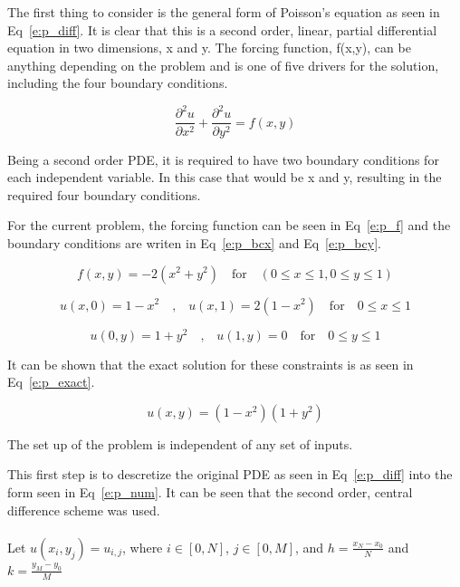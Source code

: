 \documentclass[]{aiaa-tc}%
\begin{document}
The first thing to consider is the general form of Poisson's equation as seen in
Eq~\ref{e:p_diff}. It is clear that this is a second order, linear, partial differential
equation in two dimensions, x and y. The forcing function, f(x,y), can be anything
depending on the problem and is one of five drivers for the solution, including the
four boundary conditions.

\begin{equation}
  \label{e:p_diff}
  \frac{\partial ^2 u}{\partial x^2} + \frac{\partial ^2 u}{\partial y^2} = f(x,y)
\end{equation}

Being a second order PDE, it is required to have two boundary conditions for each
independent variable. In this case that would be x and y, resulting in the required
four boundary conditions.

For the current problem, the forcing function can be seen in Eq~\ref{e:p_f}
and the boundary conditions are writen in Eq~\ref{e:p_bcx} and Eq~\ref{e:p_bcy}.

\begin{equation}
  \label{e:p_f}
  f(x,y) = -2(x^2 + y^2)\quad \textrm{for} \quad (0 \leq x \leq 1, 0 \leq y \leq 1)
\end{equation}

\begin{equation}
  \label{e:p_bcx}
  u(x,0) = 1 - x^2 \quad \textrm{,} \quad u(x,1) = 2(1 - x^2) \quad \textrm{for} \quad 0 \leq x \leq 1
\end{equation}

\begin{equation}
  \label{e:p_bcy}
  u(0,y) = 1 + y^2 \quad \textrm{,} \quad u(1,y) = 0 \quad \textrm{for} \quad 0 \leq y \leq 1
\end{equation}

It can be shown that the exact solution for these constraints is as seen in Eq~\ref{e:p_exact}.

\begin{equation}
  \label{e:p_exact}
  u(x,y) = (1 - x^2)(1 + y^2)
\end{equation}

The set up of the problem is independent of any set of inputs.

This first step is to descretize the original PDE as seen in Eq~\ref{e:p_diff} into
the form seen in Eq~\ref{e:p_num}. It can be seen that the second order, central
difference scheme was used.
\\\\
Let $u(x_i,y_j) = u_{i,j}$, where $i \in [0,N]$, $j \in [0,M]$, and $h = \frac{x_N - x_0}{N}$ and $k = \frac{y_M - y_0}{M}$
\end{document}
